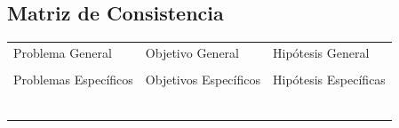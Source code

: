 \begin{appendices}
\chapter{Matriz de Consistencia}
\label{anexo3}
\begin{table}[h!]
	\centering
	\small
	\begin{tabular}{ |m{5.15cm}|m{5.15cm}|m{5.15cm}|  }
		\hline
		\rowcolor{bluejean}
		\Centering \color{white}{PROBLEMAS}& \Centering \color{white}{OBJETIVOS}& \Centering \color{white}{HIPÓTESIS}\\
		\hline
		\rowcolor{turq}
		\Centering Problema General& \Centering Objetivo General & \Centering Hipótesis General \\
		\hline
		{\ProblemaGeneral} & { \ObjetivoGeneral} & {\HipotesisGeneral} \\
		\hline
		\rowcolor{turq}
		\Centering Problemas Específicos& \Centering Objetivos Específicos & \Centering Hipótesis Específicas \\
		\hline
		{\Pbone} & {\Objone} & {\Hone} \\
		\hline
		{\Pbtwo} & {\Objtwo} & {\Htwo} \\
		\hline
		{\Pbthree} & {\Objthree} & {\Hthree} \\
		\hline
		{\Pbfour} & {\Objfour} & {\Hfour} \\
		\hline
		{\Pbfive} & {\Objfive} & {\Hfive} \\
		\hline
		{\Pbsix} & {\Objsix} & {\Hsix} \\
		\hline
	\end{tabular}
\end{table}

\end{appendices} 